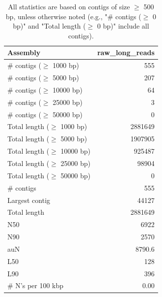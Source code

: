 \documentclass[12pt,a4paper]{article}
\begin{document}
\begin{table}[ht]
\begin{center}
\caption{All statistics are based on contigs of size $\geq$ 500 bp, unless otherwise noted (e.g., "\# contigs ($\geq$ 0 bp)" and "Total length ($\geq$ 0 bp)" include all contigs).}
\begin{tabular}{|l*{1}{|r}|}
\hline
Assembly & raw\_long\_reads \\ \hline
\# contigs ($\geq$ 1000 bp) & 555 \\ \hline
\# contigs ($\geq$ 5000 bp) & 207 \\ \hline
\# contigs ($\geq$ 10000 bp) & 64 \\ \hline
\# contigs ($\geq$ 25000 bp) & 3 \\ \hline
\# contigs ($\geq$ 50000 bp) & 0 \\ \hline
Total length ($\geq$ 1000 bp) & 2881649 \\ \hline
Total length ($\geq$ 5000 bp) & 1907905 \\ \hline
Total length ($\geq$ 10000 bp) & 925487 \\ \hline
Total length ($\geq$ 25000 bp) & 98904 \\ \hline
Total length ($\geq$ 50000 bp) & 0 \\ \hline
\# contigs & 555 \\ \hline
Largest contig & 44127 \\ \hline
Total length & 2881649 \\ \hline
N50 & 6922 \\ \hline
N90 & 2570 \\ \hline
auN & 8790.6 \\ \hline
L50 & 128 \\ \hline
L90 & 396 \\ \hline
\# N's per 100 kbp & 0.00 \\ \hline
\end{tabular}
\end{center}
\end{table}
\end{document}
